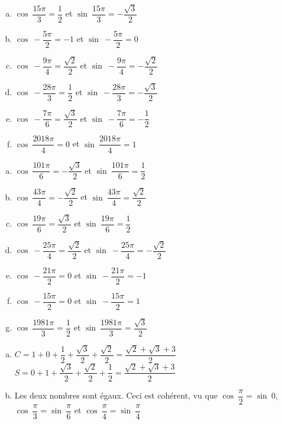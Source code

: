 \documentclass[12pt, a4paper]{article}
\begin{document}
\begin{Exercise}
    \begin{enumerate}[a)]
        \item $\cos{\ \dfrac{15\pi}{3}}=\dfrac{1}{2}$ \quad et \quad $\sin{\ \dfrac{15\pi}{3}}=-\dfrac{\sqrt{3}}{2}$
        \item $\cos{\ -\dfrac{5\pi}{2}}=-1$ \quad et \quad $\sin{\ -\dfrac{5\pi}{2}}=0$
        \item $\cos{\ -\dfrac{9\pi}{4}}=\dfrac{\sqrt{2}}{2}$ \quad et \quad $\sin{\ -\dfrac{9\pi}{4}}=-\dfrac{\sqrt{2}}{2}$
        \item $\cos{\ -\dfrac{28\pi}{3}}=\dfrac{1}{2}$ \quad et \quad $\sin{\ -\dfrac{28\pi}{3}}=-\dfrac{\sqrt{3}}{2}$
        \item $\cos{\ -\dfrac{7\pi}{6}}=\dfrac{\sqrt{3}}{2}$ \quad et \quad $\sin{\ -\dfrac{7\pi}{6}}=-\dfrac{1}{2}$
        \item $\cos{\ \dfrac{2018\pi}{4}}=0$ \quad et \quad $\sin{\ \dfrac{2018\pi}{4}}=1$
    \end{enumerate}
\end{Exercise}

\pagebreak

\begin{Exercise}[number={65}]
    \begin{enumerate}[a)]
        \item $\cos{\ \dfrac{101\pi}{6}}=-\dfrac{\sqrt{3}}{2}$ \quad et \quad $\sin{\ \dfrac{101\pi}{6}}=\dfrac{1}{2}$
        \item $\cos{\ \dfrac{43\pi}{4}}=-\dfrac{\sqrt{2}}{2}$ \quad et \quad $\sin{\ \dfrac{43\pi}{4}}=\dfrac{\sqrt{2}}{2}$
        \item $\cos{\ \dfrac{19\pi}{6}}=\dfrac{\sqrt{3}}{2}$ \quad et \quad $\sin{\ \dfrac{19\pi}{6}}=\dfrac{1}{2}$
        \item $\cos{\ -\dfrac{25\pi}{4}}=\dfrac{\sqrt{2}}{2}$ \quad et \quad $\sin{\ -\dfrac{25\pi}{4}}=-\dfrac{\sqrt{2}}{2}$
        \item $\cos{\ -\dfrac{21\pi}{2}}=0$ \quad et \quad $\sin{\ -\dfrac{21\pi}{2}}=-1$
        \item $\cos{\ -\dfrac{15\pi}{2}}=0$ \quad et \quad $\sin{\ -\dfrac{15\pi}{2}}=1$
        \item $\cos{\ \dfrac{1981\pi}{3}}=\dfrac{1}{2}$ \quad et \quad $\sin{\ \dfrac{1981\pi}{3}}=\dfrac{\sqrt{3}}{2}$
    \end{enumerate}
\end{Exercise}

\begin{Exercise}[number={65}]
    \begin{enumerate}[a)]
        \item $C=1+0+\dfrac{1}{2}+\dfrac{\sqrt{3}}{2}+\dfrac{\sqrt{2}}{2}=\dfrac{\sqrt{2}+\sqrt{3}+3}{2}$ \\ $S=0+1+\dfrac{\sqrt{3}}{2}+\dfrac{\sqrt{2}}{2}+\dfrac{1}{2}=\dfrac{\sqrt{2}+\sqrt{3}+3}{2}$
        \item Les deux nombres sont égaux. Ceci est cohérent, vu que $\cos{\ \dfrac{\pi}{2}}=\sin{\ 0}$, $\cos{\ \dfrac{\pi}{3}}=\sin{\ \dfrac{\pi}{6}}$ et $\cos{\ \dfrac{\pi}{4}}=\sin{\ \dfrac{\pi}{4}}$
    \end{enumerate}
\end{Exercise}
\end{document}
